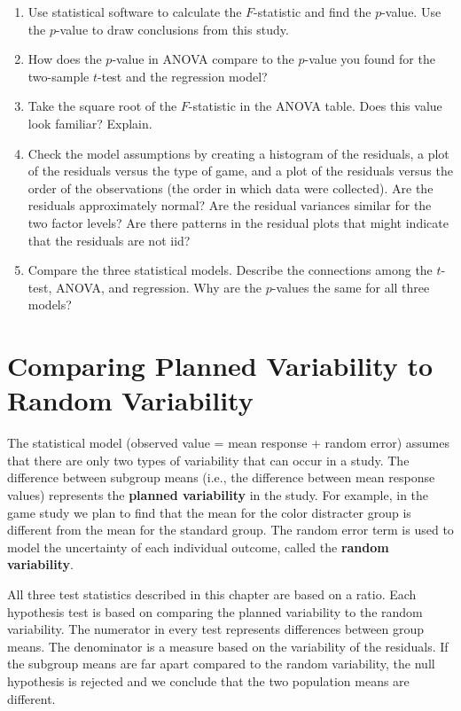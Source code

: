 \documentclass[
]{book}
\begin{document}
\begin{enumerate}
\def\labelenumi{\arabic{enumi}.}
\setcounter{enumi}{22}
\item
  Use statistical software to calculate the \(F\)-statistic and find the \(p\)-value. Use the \(p\)-value to draw conclusions from this study.
\item
  How does the \(p\)-value in ANOVA compare to the \(p\)-value you found for the two-sample \(t\)-test and the regression model?
\item
  Take the square root of the \(F\)-statistic in the ANOVA table. Does this value look familiar? Explain.
\item
  Check the model assumptions by creating a histogram of the residuals, a plot of the residuals versus the type of game, and a plot of the residuals versus the order of the observations (the order in which data were collected). Are the residuals approximately normal? Are the residual variances similar for the two factor levels? Are there patterns in the residual plots that might indicate that the residuals are not iid?
\item
  Compare the three statistical models. Describe the connections among the \(t\)-test, ANOVA, and regression. Why are the \(p\)-values the same for all three models?
\end{enumerate}

\hypertarget{comparing-planned-variability-to-random-variability}{%
\section{Comparing Planned Variability to Random Variability}\label{comparing-planned-variability-to-random-variability}}

The statistical model (observed value = mean response + random error) assumes that there are only two types of variability that can occur in a study. The difference between subgroup means (i.e., the difference between mean response values) represents the \textbf{planned variability} in the study. For example, in the game study we plan to find that the mean for the color distracter group is different from the mean for the standard group. The random error term is used to model the uncertainty of each individual outcome, called the \textbf{random variability}.

All three test statistics described in this chapter are based on a ratio. Each hypothesis test is based on comparing the planned variability to the random variability. The numerator in every test represents differences between group means. The denominator is a measure based on the variability of the residuals. If the subgroup means are far apart compared to the random variability, the null hypothesis is rejected and we conclude that the two population means are different.
\end{document}
